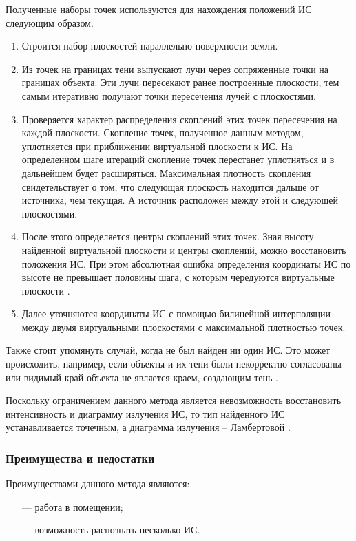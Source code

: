 Полученные наборы точек используются для нахождения положений ИС следующим образом. 

\begin{enumerate}
	\item Строится набор плоскостей параллельно поверхности земли.
	\item Из точек на границах тени выпускают лучи через сопряженные точки на границах объекта. Эти лучи пересекают ранее построенные плоскости, тем самым итеративно получают точки пересечения лучей с плоскостями.
	\item Проверяется характер распределения скоплений этих точек пересечения на каждой плоскости. Скопление точек, полученное данным методом, уплотняется при приближении виртуальной плоскости к ИС. На определенном шаге итераций скопление точек перестанет уплотняться и в дальнейшем будет расширяться. Максимальная плотность скопления свидетельствует о том, что следующая плоскость находится дальше от источника, чем текущая. А источник расположен между этой и следующей плоскостями.
	\item После этого определяется центры скоплений этих точек. Зная высоту найденной виртуальной плоскости и центры скоплений, можно восстановить положения ИС.	При этом абсолютная ошибка определения координаты ИС по высоте не превышает половины шага, с которым чередуются виртуальные плоскости  \cite{shadow_contours_method}.
	\item Далее уточняются координаты ИС с помощью билинейной интерполяции между двумя виртуальными плоскостями с максимальной плотностью точек.
\end{enumerate}

Также стоит упомянуть случай, когда не был найден ни один ИС. Это может происходить, например, если объекты и их тени были некорректно согласованы или видимый край объекта не является краем, создающим тень \cite{shadow_contours_method}.

Поскольку ограничением данного метода является невозможность восстановить интенсивность и диаграмму излучения ИС, то тип найденного ИС устанавливается точечным, а диаграмма излучения -- Ламбертовой \cite{shadow_contours_method}.

\subsubsection*{Преимущества и недостатки}

Преимуществами данного метода являются:

\begin{itemize}
	\item[---] работа в помещении;
	\item[---] возможность распознать несколько ИС. 
\end{itemize}

